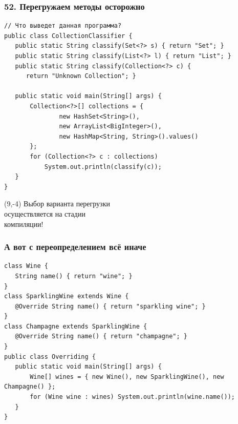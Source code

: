 \documentclass[xetex,mathserif,serif]{beamer}
\begin{document}
	\begin{frame}[fragile]
		\frametitle{52. Перегружаем методы осторожно}
		\begin{small}
			\begin{verbatim}
// Что выведет данная программа?
public class CollectionClassifier {
   public static String classify(Set<?> s) { return "Set"; }
   public static String classify(List<?> l) { return "List"; }
   public static String classify(Collection<?> c) { 
      return "Unknown Collection"; }

   public static void main(String[] args) {
       Collection<?>[] collections = {
               new HashSet<String>(),
               new ArrayList<BigInteger>(),
               new HashMap<String, String>().values()
       };
       for (Collection<?> c : collections)
           System.out.println(classify(c));
   }
}
			\end{verbatim}
		\end{small}
		\pause
		\begin{textblock}{3}(9,-4)
			Выбор варианта перегрузки \\
			осуществляется на стадии \\
			компиляции!
		\end{textblock}
	\end{frame}

	\begin{frame}[fragile]
		\frametitle{А вот с переопределением всё иначе}
		\begin{small}
			\begin{verbatim}
class Wine {
   String name() { return "wine"; }
}
class SparklingWine extends Wine {
   @Override String name() { return "sparkling wine"; }
}
class Champagne extends SparklingWine {
   @Override String name() { return "champagne"; }
}
public class Overriding {
   public static void main(String[] args) {
       Wine[] wines = { new Wine(), new SparklingWine(), new Champagne() };
       for (Wine wine : wines) System.out.println(wine.name());
   }
}
			\end{verbatim}
		\end{small}
	\end{frame}
\end{document}
